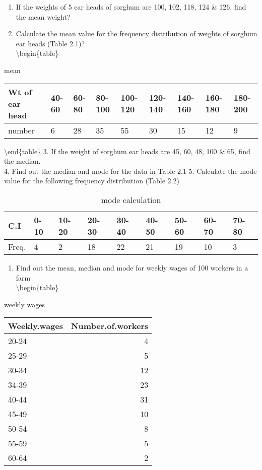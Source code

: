 \documentclass[
]{book}
\providecommand{\tightlist}{%
  \setlength{\itemsep}{0pt}\setlength{\parskip}{0pt}}
\begin{document}
\begin{enumerate}
\def\labelenumi{\arabic{enumi}.}
\item
  If the weights of 5 ear heads of sorghum are 100, 102, 118, 124 \& 126, find the mean weight?
\item
  Calculate the mean value for the frequency distribution of weights of sorghum ear heads (Table 2.1)?\\
  \textbackslash begin\{table\}
\end{enumerate}

\caption{\label{tab:t1}mean}
\centering
\begin{tabular}[t]{l|l|l|l|l|l|l|l|l}
\hline
Wt of ear head & 40-60 & 60-80 & 80-100 & 100-120 & 120-140 & 140-160 & 160-180 & 180-200\\
\hline
number & 6 & 28 & 35 & 55 & 30 & 15 & 12 & 9\\
\hline
\end{tabular}

\textbackslash end\{table\}
3. If the weight of sorghum ear heads are 45, 60, 48, 100 \& 65, find the median.\\
4. Find out the median and mode for the data in Table 2.1
5. Calculate the mode value for the following frequency distribution (Table 2.2)

\begin{table}

\caption{\label{tab:t2}mode calculation}
\centering
\begin{tabular}[t]{l|l|l|l|l|l|l|l|l}
\hline
C.I & 0-10 & 10-20 & 20-30 & 30-40 & 40-50 & 50-60 & 60-70 & 70-80\\
\hline
Freq. & 4 & 2 & 18 & 22 & 21 & 19 & 10 & 3\\
\hline
\end{tabular}
\end{table}

\begin{enumerate}
\def\labelenumi{\arabic{enumi}.}
\setcounter{enumi}{5}
\tightlist
\item
  Find out the mean, median and mode for weekly wages of 100 workers in a farm\\
  \textbackslash begin\{table\}
\end{enumerate}

\caption{\label{tab:t3}weekly wages}
\centering
\begin{tabular}[t]{l|r}
\hline
Weekly.wages & Number.of.workers\\
\hline
20-24 & 4\\
\hline
25-29 & 5\\
\hline
30-34 & 12\\
\hline
34-39 & 23\\
\hline
40-44 & 31\\
\hline
45-49 & 10\\
\hline
50-54 & 8\\
\hline
55-59 & 5\\
\hline
60-64 & 2\\
\hline
\end{tabular}
\end{document}
